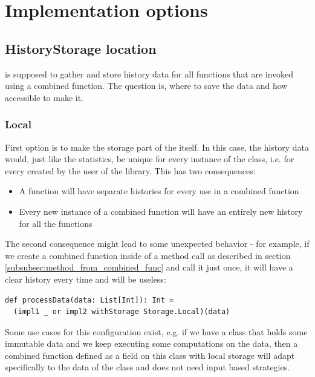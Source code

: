 \section{Implementation options}

\subsection{HistoryStorage location}
\label{subsec:storing}

 is supposed to gather and store history data for all functions that are invoked using a combined function. The question is, where to save the data and how accessible to make it.

\subsubsection{Local}

First option is to make the storage part of the  itself. In this case, the history data would, just like the statistics, be unique for every instance of the class, i.e. for every  created by the user of the library. This has two consequences:

\begin{itemize}
	\item A function will have separate histories for every use in a combined function
	\item Every new instance of a combined function will have an entirely new history for all the functions
\end{itemize}

The second consequence might lead to some unexpected behavior - for example, if we create a combined function inside of a method call as described in section \ref{subsubsec:method_from_combined_func} and call it just once, it will have a clear history every time and will be useless:

\lstset{style=Scala}
\begin{lstlisting}
def processData(data: List[Int]): Int = 
  (impl1 _ or impl2 withStorage Storage.Local)(data)
\end{lstlisting}

Some use cases for this configuration exist, e.g. if we have a class that holds some immutable data and we keep executing some computations on the data, then a combined function defined as a field on this class with local storage will adapt specifically to the data of the class and does not need input based strategies.

